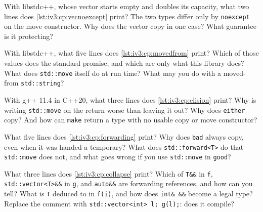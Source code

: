 \begin{question}\label{iq:iv3:cpp:15}
With libstdc++, whose vector starts empty and doubles its capacity, what two lines does \cref{lst:iv3:cp:vecnoexcept} print? The two types differ only by \texttt{noexcept} on the move constructor. Why does the vector copy in one case? What guarantee is it protecting?
\label{lst:iv3:cp:vecnoexcept}
\end{question}

\begin{question}\label{iq:iv3:cpp:16}
With libstdc++, what five lines does \cref{lst:iv3:cp:movedfrom} print? Which of those values does the standard promise, and which are only what this library does? What does \texttt{std::move} itself do at run time? What may you do with a moved-from \texttt{std::string}?
\label{lst:iv3:cp:movedfrom}
\end{question}

\begin{question}\label{iq:iv3:cpp:17}
With g++ 11.4 in C++20, what three lines does \cref{lst:iv3:cp:elision} print? Why is writing \texttt{std::move} on the return worse than leaving it out? Why does \texttt{either} copy? And how can \texttt{make} return a type with no usable copy or move constructor?
\label{lst:iv3:cp:elision}
\end{question}

\begin{question}\label{iq:iv3:cpp:18}
What five lines does \cref{lst:iv3:cp:forwarding} print? Why does \texttt{bad} always copy, even when it was handed a temporary? What does \texttt{std::forward<T>} do that \texttt{std::move} does not, and what goes wrong if you use \texttt{std::move} in \texttt{good}?
\label{lst:iv3:cp:forwarding}
\end{question}

\begin{question}\label{iq:iv3:cpp:19}
What three lines does \cref{lst:iv3:cp:collapse} print? Which of \texttt{T\&\&} in \texttt{f}, \texttt{std::vector<T>\&\&} in \texttt{g}, and \texttt{auto\&\&} are forwarding references, and how can you tell? What is \texttt{T} deduced to in \texttt{f(i)}, and how does \texttt{int\& \&\&} become a legal type? Replace the comment with \texttt{std::vector<int> l; g(l);}: does it compile?
\label{lst:iv3:cp:collapse}
\end{question}

